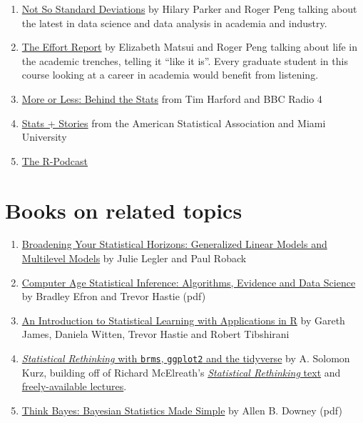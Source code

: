 \documentclass[
]{book}
\providecommand{\tightlist}{%
  \setlength{\itemsep}{0pt}\setlength{\parskip}{0pt}}
\begin{document}
\begin{enumerate}
\def\labelenumi{\arabic{enumi}.}
\tightlist
\item
  \href{http://nssdeviations.com/}{Not So Standard Deviations} by Hilary Parker and Roger Peng talking about the latest in data science and data analysis in academia and industry.
\item
  \href{http://theeffortreport.com/}{The Effort Report} by Elizabeth Matsui and Roger Peng talking about life in the academic trenches, telling it ``like it is''. Every graduate student in this course looking at a career in academia would benefit from listening.
\item
  \href{https://www.bbc.co.uk/programmes/p02nrss1}{More or Less: Behind the Stats} from Tim Harford and BBC Radio 4
\item
  \href{https://statsandstories.net/}{Stats + Stories} from the American Statistical Association and Miami University
\item
  \href{https://r-podcast.org/}{The R-Podcast}
\end{enumerate}

\hypertarget{books-on-related-topics}{%
\section{Books on related topics}\label{books-on-related-topics}}

\begin{enumerate}
\def\labelenumi{\arabic{enumi}.}
\tightlist
\item
  \href{https://bookdown.org/roback/bookdown-bysh/}{Broadening Your Statistical Horizons: Generalized Linear Models and Multilevel Models} by Julie Legler and Paul Roback
\item
  \href{https://web.stanford.edu/~hastie/CASI_files/PDF/casi.pdf}{Computer Age Statistical Inference: Algorithms, Evidence and Data Science} by Bradley Efron and Trevor Hastie (pdf)
\item
  \href{http://faculty.marshall.usc.edu/gareth-james/ISL/}{An Introduction to Statistical Learning with Applications in R} by Gareth James, Daniela Witten, Trevor Hastie and Robert Tibshirani
\item
  \href{https://bookdown.org/ajkurz/Statistical_Rethinking_recoded/}{\emph{Statistical Rethinking} with \texttt{brms}, \texttt{ggplot2} and the tidyverse} by A. Solomon Kurz, building off of Richard McElreath's \href{http://xcelab.net/rm/statistical-rethinking/}{\emph{Statistical Rethinking} text} and \href{https://www.youtube.com/channel/UCNJK6_DZvcMqNSzQdEkzvzA/playlists}{freely-available lectures}.
\item
  \href{http://www.greenteapress.com/thinkbayes/thinkbayes.pdf}{Think Bayes: Bayesian Statistics Made Simple} by Allen B. Downey (pdf)
\end{enumerate}
\end{document}
